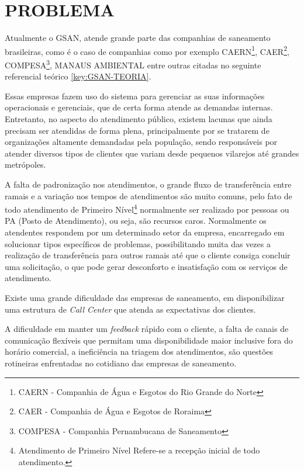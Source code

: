 \section*{PROBLEMA}
Atualmente o GSAN, atende grande parte das companhias de saneamento brasileiras, como é o caso de companhias como por exemplo CAERN\footnote{CAERN - Companhia de Água e Esgotos do Rio Grande do Norte}, CAER\footnote{CAER - Companhia de Água e Esgotos de Roraima}, COMPESA\footnote{COMPESA - Companhia Pernambucana de Saneamento}, MANAUS AMBIENTAL entre outras citadas no seguinte referencial teórico \ref{key:GSAN-TEORIA}.

Essas empresas fazem uso do sistema para gerenciar as suas informações operacionais e gerenciais, que de certa forma atende as demandas internas. Entretanto, no aspecto do atendimento público, existem lacunas que ainda precisam ser atendidas de forma plena, principalmente por se tratarem de organizações altamente demandadas pela população, sendo responsáveis por atender diversos tipos de clientes que variam desde pequenos vilarejos até grandes metrópoles.

A falta de padronização nos atendimentos, o grande fluxo de transferência entre ramais e a variação nos tempos de atendimentos são muito comuns, pelo fato de todo atendimento de Primeiro Nível\footnote{Atendimento de Primeiro Nível Refere-se a recepção inicial de todo atendimento.} normalmente ser realizado por pessoas ou PA (Posto de Atendimento), ou seja, são recursos caros. Normalmente os atendentes respondem por um determinado setor da empresa, encarregado em solucionar tipos específicos de problemas, possibilitando muita das vezes a realização de transferência para outros ramais até que o cliente consiga concluir uma solicitação, o que pode gerar desconforto e insatisfação com os serviços de atendimento.
	
Existe uma grande dificuldade das empresas de saneamento, em disponibilizar uma estrutura de \textit{Call Center} que atenda as expectativas dos clientes.

A dificuldade em manter um \textit{feedback} rápido com o cliente, a falta de canais de comunicação flexíveis que permitam uma disponibilidade maior inclusive fora do horário comercial, a ineficiência na triagem dos atendimentos, são questões rotineiras enfrentadas no cotidiano das empresas de saneamento.
